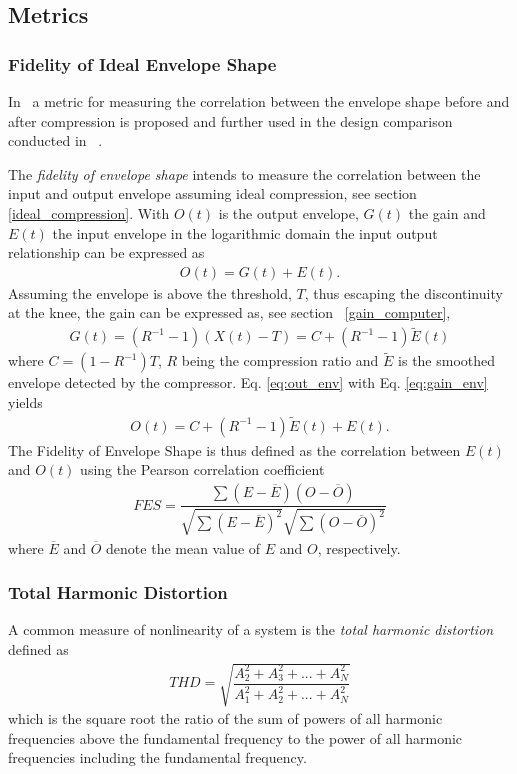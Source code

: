\documentclass[../main2.tex]{subfiles}
\begin{document}
\subsection{Metrics}

\subsubsection{Fidelity of Ideal Envelope Shape} \label{fes}
In~\cite{stone2007quantifying} a metric for measuring the correlation between the envelope shape before and after compression is proposed and further used in the design comparison conducted in ~\cite{reiss2012tutorial}. 

The \emph{fidelity of envelope shape} intends to measure the correlation between the input and output envelope assuming ideal compression, see section \ref{ideal_compression}.
With $O(t)$ is the output envelope, $G(t)$ the gain and $E(t)$ the input envelope in the logarithmic domain the input output relationship can be expressed as
 \begin{align}
O(t) = G(t) + E(t).
\label{eq:out_env}
\end{align}
Assuming the envelope is above the threshold, $T$, thus escaping the discontinuity at the knee, the gain can be expressed as, see section ~\ref{gain_computer},
\begin{align}
G(t) = (R^{-1}-1)(X(t)-T) = C + (R^{-1}-1)\tilde{E}(t)
\label{eq:gain_env}
\end{align}
where $C = (1-R^{-1})T$, $R$ being the compression ratio and $\tilde{E}$ is the smoothed envelope detected by the compressor. Eq. \eqref{eq:out_env} with Eq. \eqref{eq:gain_env} yields
\begin{align}
O(t) = C + (R^{-1}-1)\tilde{E}(t) + E(t).
\end{align}
The Fidelity of Envelope Shape is thus defined as the correlation between $E(t)$ and $O(t)$ using the Pearson correlation coefficient
\begin{align}
FES = \dfrac{\sum(E-\overline{E})(O-\overline{O})}{\sqrt{\sum(E-\overline{E})^2}\sqrt{\sum(O-\overline{O})^2}}
\end{align}
where $\overline{E}$ and $\overline{O}$ denote the mean value of $E$ and $O$, respectively.

\subsubsection{Total Harmonic Distortion}
A common measure of nonlinearity of a system is the \emph{total harmonic distortion} defined as \cite{dafx02}
\begin{align}
THD = \sqrt{\dfrac{A_2^2 + A_3^2 + ... + A_N^2}{A_1^2 + A_2^2 + ... + A_N^2}}
\end{align}
which is the square root the ratio of the sum of powers of all harmonic frequencies above the fundamental frequency to the power of all harmonic frequencies including the fundamental frequency.
\end{document}
